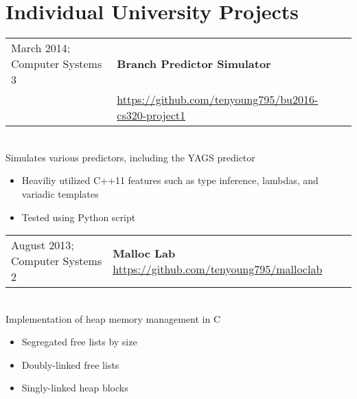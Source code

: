 \documentclass[letterpaper,10pt]{article} %
\begin{document}
\section{Individual University Projects}

\begin{tabular}{@{}p{3in}l}
    March 2014; Computer Systems 3 & \textbf{Branch Predictor Simulator} \\
    & \footnotesize{\url{https://github.com/tenyoung795/bu2016-cs320-project1}}
\end{tabular} \\
Simulates various predictors, including the YAGS predictor
\begin{itemize}
    \item Heaviliy utilized C++11 features such as type inference, lambdas, and variadic templates
    \item Tested using Python script
\end{itemize}

\begin{tabular}{@{}p{3in}l}
    August 2013; Computer Systems 2 & \textbf{Malloc Lab} \footnotesize{\url{https://github.com/tenyoung795/malloclab}}
\end{tabular} \\
Implementation of heap memory management in C
\begin{itemize}
    \item Segregated free lists by size
    \item Doubly-linked free lists
    \item Singly-linked heap blocks
\end{itemize}
\end{document}
